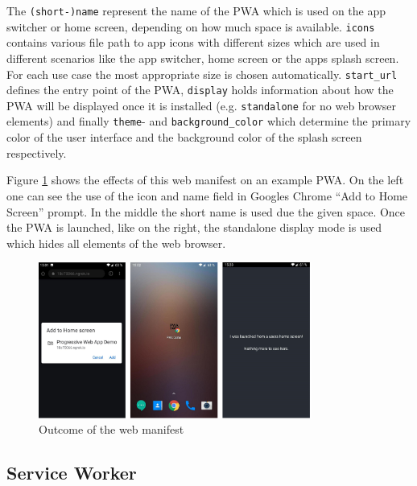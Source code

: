 \begin{center}
	\begin{minipage}{\textwidth}
		
	\end{minipage}
\end{center}

The \texttt{(short-)name} represent the name of the PWA which is used on the app switcher or home screen, depending on how much space is available. \texttt{icons} contains various file path to app icons with different sizes which are used in different scenarios like the app switcher, home screen or the apps splash screen. For each use case the most appropriate size is chosen automatically. \texttt{start\_url} defines the entry point of the PWA, \texttt{display} holds information about how the PWA will be displayed once it is installed (e.g. \texttt{standalone} for no web browser elements) and finally \texttt{theme}- and \texttt{background\_color} which determine the primary color of the user interface and the background color of the splash screen respectively. \cite{HowMakePWAs}

Figure \ref{fig:pwa_webmanifest} shows the effects of this web manifest on an example PWA. On the left one can see the use of the icon and name field in Googles Chrome “Add to Home Screen” prompt. In the middle the short name is used due the given space. Once the PWA is launched, like on the right, the standalone display mode is used which hides all elements of the web browser. 

\begin{figure}[htbp] 
	\centering
	\includegraphics[width=0.8\textwidth]{Assets/chapter_pwa/manifest_demo.png}
	\caption{Outcome of the web manifest}
	\label{fig:pwa_webmanifest}
\end{figure}

\subsection{Service Worker}
\label{sec:theorieCc}

